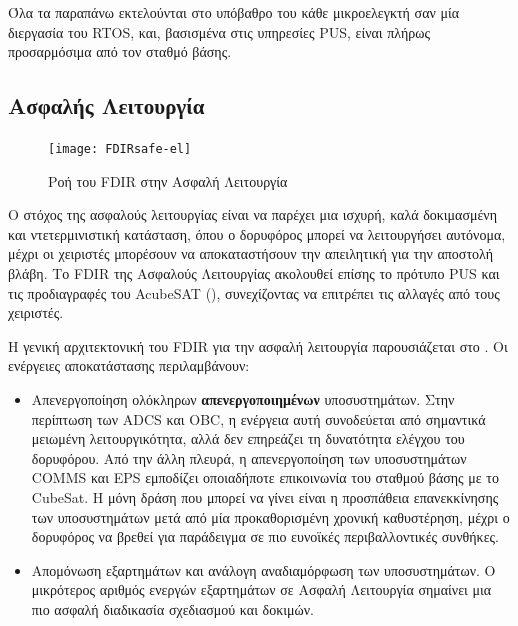 \documentclass[a4paper,nobib]{tufte-book}
\begin{document}
Όλα τα παραπάνω εκτελούνται στο υπόβαθρο του κάθε μικροελεγκτή σαν μία διεργασία του \acs{RTOS}, και, βασισμένα στις υπηρεσίες \acs{PUS}, είναι πλήρως προσαρμόσιμα από τον σταθμό βάσης.

\subsection{Ασφαλής Λειτουργία}

\begin{figure}[h]
	\texttt{[image: FDIRsafe-el]}
	\caption{Ροή του \acs{FDIR} στην Ασφαλή Λειτουργία}
	\label{fig:safeflow}
\end{figure}

Ο στόχος της ασφαλούς λειτουργίας είναι να παρέχει μια ισχυρή, καλά δοκιμασμένη και ντετερμινιστική κατάσταση, όπου ο δορυφόρος μπορεί να λειτουργήσει αυτόνομα, μέχρι οι χειριστές μπορέσουν να αποκαταστήσουν την απειλητική για την αποστολή βλάβη. Το \acs{FDIR} της Ασφαλούς Λειτουργίας ακολουθεί επίσης το πρότυπο \acs{PUS} και τις προδιαγραφές του AcubeSAT (), συνεχίζοντας να επιτρέπει τις αλλαγές από τους χειριστές.

Η γενική αρχιτεκτονική του \acs{FDIR} για την ασφαλή λειτουργία παρουσιάζεται στο . Οι ενέργειες αποκατάστασης περιλαμβάνουν:
\begin{itemize}
	\item Απενεργοποίηση ολόκληρων \textbf{απενεργοποιημένων} υποσυστημάτων. Στην περίπτωση των \acs{ADCS} και \acs{OBC}, η ενέργεια αυτή συνοδεύεται από σημαντικά μειωμένη λειτουργικότητα, αλλά δεν επηρεάζει τη δυνατότητα ελέγχου του δορυφόρου. Από την άλλη πλευρά, η απενεργοποίηση των υποσυστημάτων \acs{COMMS} και \acs{EPS} εμποδίζει οποιαδήποτε επικοινωνία του σταθμού βάσης με το CubeSat. Η μόνη δράση που μπορεί να γίνει είναι η προσπάθεια επανεκκίνησης των υποσυστημάτων μετά από μία προκαθορισμένη χρονική καθυστέρηση, μέχρι ο δορυφόρος να βρεθεί για παράδειγμα σε πιο ευνοϊκές περιβαλλοντικές συνθήκες.
	\item Απομόνωση εξαρτημάτων και ανάλογη αναδιαμόρφωση των υποσυστημάτων. Ο μικρότερος αριθμός ενεργών εξαρτημάτων σε Ασφαλή Λειτουργία σημαίνει μια πιο ασφαλή διαδικασία σχεδιασμού και δοκιμών.
\end{itemize}
\end{document}
